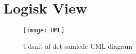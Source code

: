 \documentclass[Main]{subfiles}
\begin{document}
\section{Logisk View}

\begin{figure}[H]
\centering
\texttt{[image: UML]}
\caption{Udsnit af det samlede UML diagram}
\end{figure}

\newpage


\newpage

\end{document}
